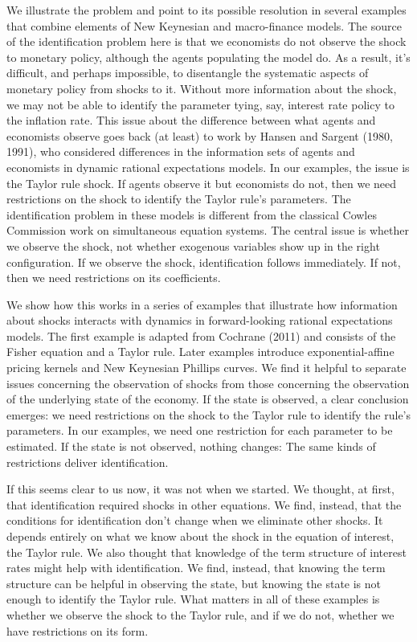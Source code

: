 \documentclass[12pt]{article}
\newcounter{fig}
\begin{document}
{We illustrate the problem and point to its possible resolution in several
examples that combine elements of New Keynesian and macro-finance models.
The source of the identification problem here is that we economists do not
observe the shock to monetary policy, although the agents populating the model do.
As a result, it's difficult, and perhaps impossible,
to disentangle the systematic aspects of monetary policy from shocks to it.
Without more information about the shock,
we may not be able to identify the parameter tying, say,
interest rate policy to the inflation rate.
%
This issue about the difference between what agents and economists observe
goes back (at least) to work by Hansen and Sargent (1980, 1991),
who considered differences in the information sets of agents
and economists in dynamic rational expectations models.
In our examples, the issue is the Taylor rule shock.
If agents observe it but economists do not,
then we need restrictions on the shock to identify
the Taylor rule's parameters.
The identification problem in these models is different
from the classical Cowles Commission work on simultaneous equation systems.
The central issue is whether we observe the shock, not whether
exogenous variables show up in the right configuration.
If we observe the shock, identification follows immediately.
If not, then we need restrictions on its coefficients.

We show how this works in a series of examples that illustrate
how information about shocks interacts with dynamics in forward-looking rational expectations
models.
The first example is adapted from Cochrane (2011)
and consists of the Fisher equation and a Taylor rule.
Later examples introduce exponential-affine pricing kernels
and New Keynesian Phillips curves.
We find it helpful to separate issues concerning the observation of shocks
from those concerning the observation of the underlying state of the economy.
If the state is observed, a clear conclusion emerges:
we need restrictions on the shock to the Taylor rule to
identify the rule's parameters.
In our examples, we need one restriction for each parameter to be estimated.
If the state is not observed, nothing changes:  The same kinds of restrictions
deliver identification.

If this seems clear to us now, it was not when we started.
We thought, at first, that identification required shocks in other equations.
We find, instead, that the conditions for identification don't change
when we eliminate other shocks. %
It depends entirely on what we know about the shock in the equation of interest,
the Taylor rule.
We also thought that knowledge of the term structure of interest rates
might help with identification.
We find, instead, that knowing the term structure can be helpful
in observing the state, but knowing the state is not enough to identify the Taylor rule.
What matters in all of these examples is whether we observe the shock to the Taylor rule,
and if we do not, whether we have restrictions on its form.

}
\end{document}
